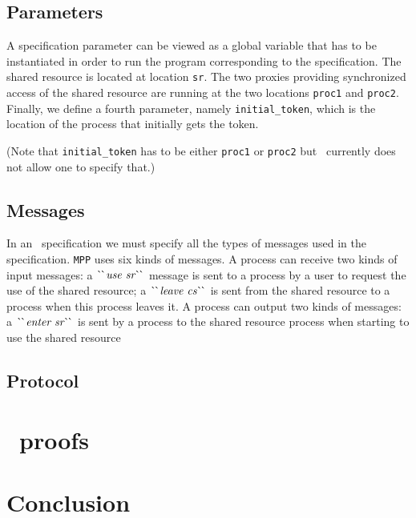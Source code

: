 \documentclass[final]{article}
\begin{document}
\subsection{Parameters}

A specification parameter can be viewed as a global variable that has
to be instantiated in order to run the program corresponding to the
specification.
%
The shared resource is located at location \lstinline{sr}.
%
The two proxies providing synchronized access of the shared resource
are running at the two locations \lstinline{proc1} and
\lstinline{proc2}.
%
Finally, we define a fourth parameter, namely
\lstinline{initial_token}, which is the location of the process that
initially gets the token.
\begin{emlcode}
  
\end{emlcode}
(Note that \lstinline{initial_token} has to be either
\lstinline{proc1} or \lstinline{proc2} but \eml\ currently does not
allow one to specify that.)


\subsection{Messages}

In an \eml\ specification we must specify all the types of messages
used in the specification.
%
\lstinline{MPP} uses six kinds of messages.  A process can receive two
kinds of input messages: a $\CONSatoms{use sr}$ message is sent to a
process by a user to request the use of the shared resource; a
$\CONSatoms{leave cs}$ is sent from the shared resource to a process
when this process leaves it.  A process can output two kinds of
messages: a $\CONSatoms{enter sr}$ is sent by a process to the shared
resource process when starting to use the shared resource
\begin{emlcode}
  
\end{emlcode}


\subsection{Protocol}

\begin{emlcode}
  
\end{emlcode}

\begin{emlcode}
  
\end{emlcode}


\section{\nuprl\ proofs}


\section{Conclusion}
\end{document}
